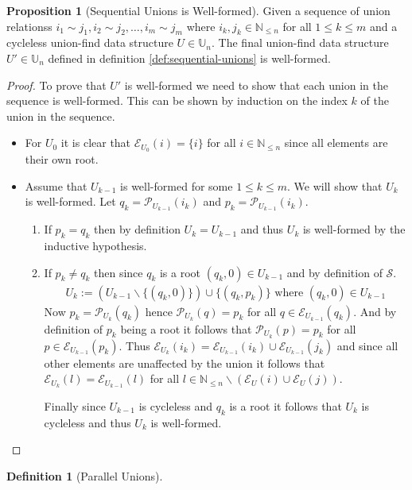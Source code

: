 \documentclass[a4paper,12pt]{article}
\theoremstyle{definition}
\newtheorem{definition}{Definition}[section]
\newtheorem{proposition}{Proposition}[section]
\begin{document}
\begin{proposition}[Sequential Unions is Well-formed]
    Given a sequence of union relationss $i_1 \sim j_1, i_2 \sim j_2, \ldots,
    i_m \sim j_m$ where $i_k, j_k \in \mathbb{N}_{\leq n}$ for all $1 \leq k
    \leq m$ and a cycleless union-find data structure $U \in \mathbb{U}_n$. The
    final union-find data structure $U' \in \mathbb{U}_n$ defined in definition
    \ref{def:sequential-unions} is well-formed.
\end{proposition}
\begin{proof}
    To prove that $U'$ is well-formed we need to show that each union in the
    sequence is well-formed. This can be shown by induction on the index $k$ of
    the union in the sequence.
    \begin{itemize}
        \item For $U_0$ it is clear that $\mathcal{E}_{U_0}(i) = \{i\}$ for all $i \in
        \mathbb{N}_{\leq n}$ since all elements are their own root.
        \item Assume that $U_{k-1}$ is well-formed for some $1 \leq k \leq m$.
        We will show that $U_k$ is well-formed. Let $q_k
        =\mathcal{P}_{U_{k-1}}(i_k)$ and $p_k = \mathcal{P}_{U_{k-1}}(i_k)$.
        \begin{enumerate}
            \item If $p_k = q_k$ then by definition $U_k = U_{k-1}$ and thus
            $U_k$ is well-formed by the inductive hypothesis.
            \item If $p_k \neq q_k$ then since $q_k$ is a root $(q_k, 0) \in U_{k - 1}$ and by definition
            of $\mathcal{S}$.
            \begin{align*}
                U_k := (U_{k-1} \backslash \{(q_k, 0)\}) \cup \{(q_k, p_k)\} \text{ where } (q_k, 0) \in U_{k-1}
            \end{align*}
            Now $p_k = \mathcal{P}_{U_k}(q_k)$ hence $\mathcal{P}_{U_k}(q) = p_k$ for all $q
            \in \mathcal{E}_{U_{k - 1}}(q_k)$. And by definition of $p_k$ being
            a root it follows that $\mathcal{P}_{U_k}(p) = p_k$ for all $p \in
            \mathcal{E}_{U_{k - 1}}(p_k)$. Thus $\mathcal{E}_{U_k}(i_k) =
            \mathcal{E}_{U_{k - 1}}(i_k) \cup \mathcal{E}_{U_{k - 1}}(j_k)$ and
            since all other elements are unaffected by the union it follows that
            $\mathcal{E}_{U_k}(l) = \mathcal{E}_{U_{k - 1}}(l)$ for all $l \in
            \mathbb{N}_{\leq n} \backslash (\mathcal{E}_U(i) \cup
            \mathcal{E}_U(j))$.

            Finally since $U_{k-1}$ is cycleless and $q_k$ is a root it follows
            that $U_k$ is cycleless and thus $U_k$ is well-formed.
        \end{enumerate}
    \end{itemize}
\end{proof}

\begin{definition}[Parallel Unions]
\end{definition}
\end{document}
